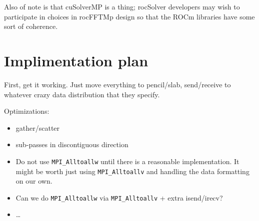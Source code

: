 \documentclass[12pt]{article}
\renewcommand{\(}{\left(}
\renewcommand{\)}{\right)}
\begin{document}
Also of note is that cuSolverMP is a thing; rocSolver developers may
wish to participate in choices in rocFFTMp design so that the ROCm libraries
have some sort of coherence.


\section{Implimentation plan}

First, get it working.  Just move everything to pencil/slab, send/receive
to whatever crazy data distribution that they specify.

Optimizations:
\begin{itemize}
\item gather/scatter
\item sub-passes in discontiguous direction
\item Do not use \texttt{MPI_Alltoallw} until there is a reasonable
  implementation.  It might be worth just using \texttt{MPI_Alltoallv}
  and handling the data formatting on our own.
\item Can we do \texttt{MPI_Alltoallw} via \texttt{MPI_Alltoallv} +
  extra isend/irecv?
\item \dots
\end{itemize}




\end{document}
